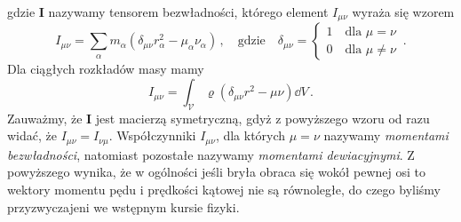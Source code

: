 \documentclass[../main.tex]{subfiles}
\begin{document}
gdzie \(\mathbf{I}\) nazywamy tensorem bezwładności, którego element \(I_{\mu\nu}\) wyraża się wzorem
\begin{equation*}
    I_{\mu\nu}=\sum_\alpha m_\alpha\left(\delta_{\mu\nu}r_\alpha^2-\mu_\alpha\nu_\alpha\right)\,,\quad\text{gdzie}\quad \delta_{\mu\nu}=\begin{cases}1\quad\text{dla \(\mu=\nu\)}\\0\quad\text{dla \(\mu\neq\nu\)}\end{cases}\,.
\end{equation*}
Dla ciągłych rozkładów masy mamy
\begin{equation*}
    I_{\mu\nu}=\int_{\mathcal{V}}\varrho(\delta_{\mu\nu}r^2-\mu\nu)\dd{V}\,.
\end{equation*}
Zauważmy, że \(\mathbf{I}\) jest macierzą symetryczną, gdyż z powyższego wzoru od razu widać, że \(I_{\mu\nu}=I_{\nu\mu}\). Współczynniki \(I_{\mu\nu}\), dla których \(\mu=\nu\) nazywamy \textit{momentami bezwładności}, natomiast pozostałe nazywamy \textit{momentami dewiacyjnymi}. Z powyższego wynika, że w ogólności jeśli bryła obraca się wokół pewnej osi to wektory momentu pędu i prędkości kątowej nie są równoległe, do czego byliśmy przyzwyczajeni we wstępnym kursie fizyki.
\medskip
\end{document}
